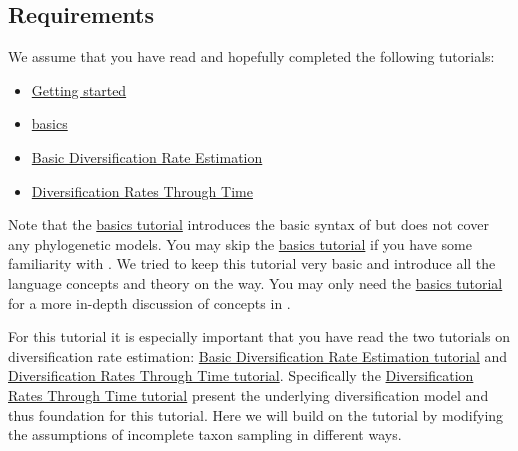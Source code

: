 \subsection{Requirements}
We assume that you have read and hopefully completed the following tutorials:
\begin{itemize}
\item \href{https://github.com/revbayes/revbayes_tutorial/raw/master/tutorial_TeX/RB_Getting_Started/RB_Getting_Started.pdf}{Getting started}
\item \href{https://github.com/revbayes/revbayes_tutorial/raw/master/tutorial_TeX/RB_Basics_Tutorial/RB_Basics_Tutorial.pdf}{\Rev basics}
\item \href{https://github.com/revbayes/revbayes_tutorial/raw/master/tutorial_TeX/RB_DiversificationRate_Tutorial/RB_DiversificationRate_Tutorial.pdf}{Basic Diversification Rate Estimation}
\item \href{https://github.com/revbayes/revbayes_tutorial/raw/master/tutorial_TeX/RB_DiversificationRate_Episodic_Tutorial/RB_DiversificationRate_Episodic_Tutorial.pdf}{Diversification Rates Through Time}
\end{itemize}
Note that the \href{https://github.com/revbayes/revbayes_tutorial/raw/master/tutorial_TeX/RB_Basics_Tutorial/RB_Basics_Tutorial.pdf}{\Rev basics tutorial} introduces the basic syntax of \Rev but does not cover any phylogenetic models.
You may skip the \href{https://github.com/revbayes/revbayes_tutorial/raw/master/tutorial_TeX/RB_Basics_Tutorial/RB_Basics_Tutorial.pdf}{\Rev basics tutorial} if you have some familiarity with \R.
We tried to keep this tutorial very basic and introduce all the language concepts and theory on the way.
You may only need the \href{https://github.com/revbayes/revbayes_tutorial/raw/master/tutorial_TeX/RB_Basics_Tutorial/RB_Basics_Tutorial.pdf}{\Rev basics tutorial} for a more in-depth discussion of concepts in \Rev.

For this tutorial it is especially important that you have read the two tutorials on diversification rate estimation: \href{https://github.com/revbayes/revbayes_tutorial/raw/master/tutorial_TeX/RB_DiversificationRate_Tutorial/RB_DiversificationRate_Tutorial.pdf}{Basic Diversification Rate Estimation tutorial} and \href{https://github.com/revbayes/revbayes_tutorial/raw/master/tutorial_TeX/RB_DiversificationRate_Episodic_Tutorial/RB_DiversificationRate_Episodic_Tutorial.pdf}{Diversification Rates Through Time tutorial}.
Specifically the \href{https://github.com/revbayes/revbayes_tutorial/raw/master/tutorial_TeX/RB_DiversificationRate_Episodic_Tutorial/RB_DiversificationRate_Episodic_Tutorial.pdf}{Diversification Rates Through Time tutorial} present the underlying diversification model and thus foundation for this tutorial.
Here we will build on the tutorial by modifying the assumptions of incomplete taxon sampling in different ways.


